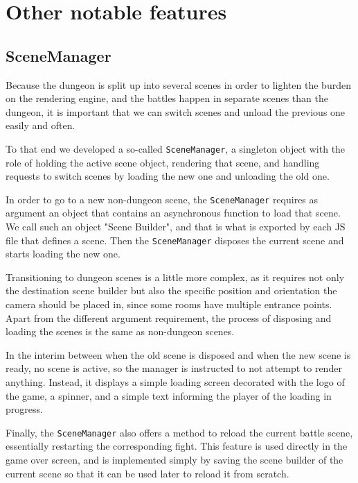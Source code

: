 
{
\let\clearpage\relax

\chapter{Other notable features}
}

\section{SceneManager}
Because the dungeon is split up into several scenes in order to lighten the burden on the rendering engine, and the battles happen in separate scenes than the dungeon, it is important that we can switch scenes and unload the previous one easily and often.

To that end we developed a so-called \texttt{SceneManager}, a singleton object with the role of holding the active scene object, rendering that scene, and handling requests to switch scenes by loading the new one and unloading the old one.

In order to go to a new non-dungeon scene, the \texttt{SceneManager} requires as argument an object that contains an asynchronous function to load that scene. We call such an object "Scene Builder", and that is what is exported by each JS file that defines a scene. Then the \texttt{SceneManager} disposes the current scene and starts loading the new one.

Transitioning to dungeon scenes is a little more complex, as it requires not only the destination scene builder but also the specific position and orientation the camera should be placed in, since some rooms have multiple entrance points. Apart from the different argument requirement, the process of disposing and loading the scenes is the same as non-dungeon scenes.

In the interim between when the old scene is disposed and when the new scene is ready, no scene is active, so the manager is instructed to not attempt to render anything. Instead, it displays a simple loading screen decorated with the logo of the game, a spinner, and a simple text informing the player of the loading in progress.

Finally, the \texttt{SceneManager} also offers a method to reload the current battle scene, essentially restarting the corresponding fight. This feature is used directly in the game over screen, and is implemented simply by saving the scene builder of the current scene so that it can be used later to reload it from scratch.


